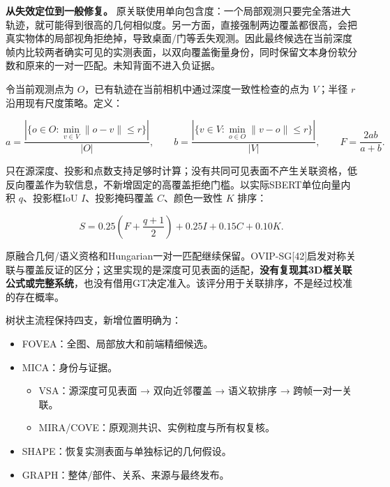 \documentclass[UTF8,fontset=fandol]{ctexart}
\begin{document}
\textbf{从失效定位到一般修复。} 原关联使用单向包含度：一个局部观测只要完全落进大轨迹，就可能得到很高的几何相似度。另一方面，直接强制两边覆盖都很高，会把真实物体的局部视角拒绝掉，导致桌面/门等丢失观测。因此最终候选在当前深度帧内比较两者确实可见的实测表面，以双向覆盖衡量身份，同时保留文本身份软分数和原来的一对一匹配。未知背面不进入负证据。



令当前观测点为 $O$，已有轨迹在当前相机中通过深度一致性检查的点为 $V$；半径 $r$ 沿用现有尺度策略。定义：



\[
a=\frac{\left|\{o\in O:\min_{v\in V}\|o-v\|\le r\}\right|}{|O|},\qquad
b=\frac{\left|\{v\in V:\min_{o\in O}\|v-o\|\le r\}\right|}{|V|},\qquad
F=\frac{2ab}{a+b}.
\]

只在源深度、投影和点数支持足够时计算；没有共同可见表面不产生关联资格，低反向覆盖作为软信息，不新增固定的高覆盖拒绝门槛。以实际SBERT单位向量内积 $q$、投影框IoU $I$、投影掩码覆盖 $C$、颜色一致性 $K$ 排序：



\[
S=0.25\left(F+\frac{q+1}{2}\right)+0.25I+0.15C+0.10K.
\]

原融合几何/语义资格和Hungarian一对一匹配继续保留。OVIP-SG[42]启发对称关联与覆盖反证的区分；这里实现的是深度可见表面的适配，\textbf{没有复现其3D框关联公式或完整系统}，也没有借用GT决定准入。该评分用于关联排序，不是经过校准的存在概率。



树状主流程保持四支，新增位置明确为：



\begin{itemize}
\item FOVEA：全图、局部放大和前端精细候选。


\item MICA：身份与证据。


\begin{itemize}
\item VSA：源深度可见表面 → 双向近邻覆盖 → 语义软排序 → 跨帧一对一关联。


\item MIRA/COVE：原观测共识、实例粒度与所有权复核。

\end{itemize}

\item SHAPE：恢复实测表面与单独标记的几何假设。


\item GRAPH：整体/部件、关系、来源与最终发布。

\end{itemize}
\end{document}
